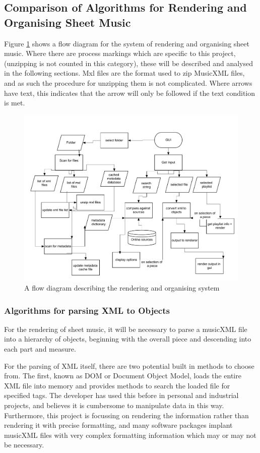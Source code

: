 \subsection{Comparison of Algorithms for Rendering and Organising Sheet Music}
Figure \ref{fig:flow} shows a flow diagram for the system of rendering and organising sheet music. Where there are process markings which are specific to this project,(unzipping is not counted in this category), these will be described and analysed in the following sections.
Mxl files are the format used to zip MusicXML files, and as such the procedure for unzipping them is not complicated. Where arrows have text, this indicates that the arrow will only be followed if the text condition is met.
\begin{figure}[h]
    \centering
    \includegraphics[width=350pt]{flowchart}
    \caption{A flow diagram describing the rendering and organising system}
    \label{fig:flow}
\end{figure}

\subsubsection{Algorithms for parsing XML to Objects}
For the rendering of sheet music, it will be necessary to parse a musicXML file into a hierarchy of objects, beginning with the overall piece and descending into each part and measure. 

For the parsing of XML itself, there are two potential built in methods to choose from. The first, known as DOM or Document Object Model, loads the entire XML file into memory and provides methods to search the loaded file for specified tags. The developer has used this before in personal and industrial projects, and believes it is cumbersome to manipulate data in this way. Furthermore, this project is focussing on rendering the information rather than rendering it with precise formatting, and many software packages implant musicXML files with very complex formatting information which may or may not be necessary.

